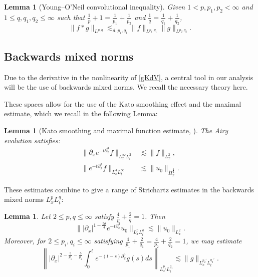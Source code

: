 \documentclass[10pt, reqno]{amsart}
\numberwithin{equation}{section}
\newtheorem{lemma}[theorem]{Lemma}
\theoremstyle{definition}
\theoremstyle{remark}
\begin{document}
    \begin{lemma}[Young--O'Neil convolutional inequality]
        Given $1 < p,p_1,p_2 < \infty$ and $1 \leq q, q_1,q_2 \leq \infty$ such that
        $\frac{1}{p} + 1 = \frac{1}{p_1} + \frac{1}{p_2}$ and $\frac{1}{q} = \frac{1}{q_1} + \frac{1}{q_2}$,
        \begin{equation*}
            \|f*g\|_{L^{p,q}} \lesssim_{d,p_i,q_i} \|f\|_{L^{p_1,q_1}} \|g\|_{L^{p_2,q_2}}.
        \end{equation*}
    \end{lemma}


\subsection{Backwards mixed norms}
    Due to the derivative in the nonlinearity of \eqref{gKdV}, a central tool in our analysis will be the use of backwards mixed norms. We recall the necessary theory here.
    
    These spaces allow for the use of the Kato smoothing effect and the maximal estimate, which we recall in the following Lemma:
    \begin{lemma}[Kato smoothing and maximal function estimate, \cite{KPV93}] 
        The Airy evolution satisfies: 
        \begin{align}
            \big\|\partial_x e^{-t\partial^3_x}f \big\|_{L^\infty_xL^2_{t}} & \lesssim \|f\|_{L^{2}_{x}}, \label{prel/kato}\\
            \big\|e^{-t\partial^3_x} f\big\|_{L_{x}^{4} L_{t}^{\infty}} & \lesssim  \|u_0\|_{\dot{H}^{\frac{1}{4}}_x}. \label{prel/maximal}
    	\end{align}
    \end{lemma}
    
    These estimates combine to give a range of Strichartz estimates in the backwards mixed norms $L_x^pL_t^q$:
    \begin{lemma} \label{gKdVL(XT)Norm}
    Let $2 \leq p,q \leq \infty$ satisfy $\frac{4}{p}+\frac{2}{q}=1$. Then
    	\begin{equation}
    		\big\||\partial_x|^{1-\frac{5\theta}{4}}e^{-t\partial^3_x} u_0\big\|_{L_{x}^{p} L_{t}^{q}} \lesssim  \|u_0\|_{L^{2}_x}.
    	\end{equation}
    Moreover, for $2\leq p_i,q_i  \leq \infty$ satisfying $\frac{4}{p_1}+\frac{2}{q_1}=\frac{4}{p_2}+\frac{2}{q_2}=1$, we may estimate
    	\begin{equation}
    		\left\||\partial_x|^{2-\frac{5}{p_1}-\frac{5}{p_2}}\int_{0}^{t} e^{-(t-s)\partial^3_x}g(s) ds\right\|_{L_{x}^{p_1} L_{t}^{q_1}} \lesssim  \|g\|_{L_{x}^{p_2'} L_{t}^{q_2'}}.
    	\end{equation}
    \end{lemma}
\end{document}
